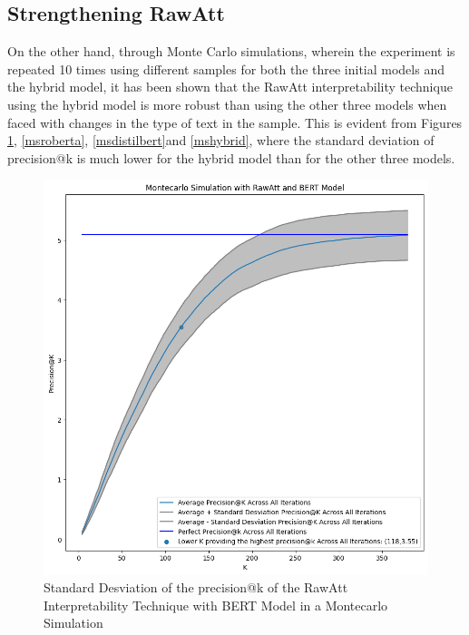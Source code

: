 \subsection{Strengthening RawAtt}

On the other hand, through Monte Carlo simulations, wherein the experiment is repeated 10 times using different samples for both the three initial models and the hybrid model, it has been shown that the RawAtt interpretability technique using the hybrid model is more robust than using the other three models when faced with changes in the type of text in the sample. This is evident from Figures \ref{msbert}, \ref{msroberta}, \ref{msdistilbert}and \ref{mshybrid}, where the standard deviation of precision@k is much lower for the hybrid model than for the other three models. 

\begin{figure}[H]
    \centering%
    \includegraphics[width=0.75\linewidth]{Figures/Experimental Setup/Fill_Between_BERT_RawAtt.png}
    \caption{Standard Desviation of the precision@k of the RawAtt Interpretability Technique with BERT Model in a Montecarlo Simulation}
    \label{msbert}
\end{figure}


